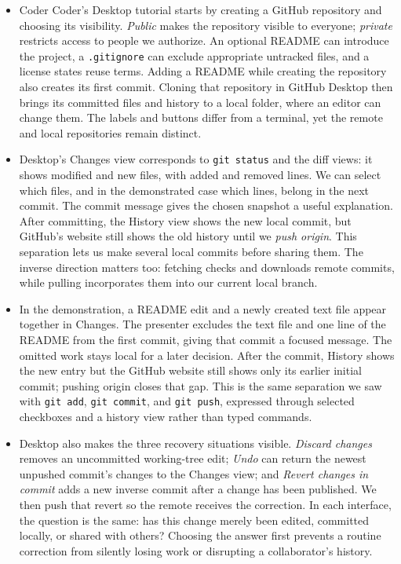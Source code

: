 \documentclass[10pt]{article}
\begin{document}
\begin{itemize}[leftmargin=1.25em, itemsep=0.3em, parsep=0pt, topsep=0pt]
    \item Coder Coder's Desktop tutorial starts by creating a GitHub repository and choosing its visibility. \emph{Public} makes the repository visible to everyone; \emph{private} restricts access to people we authorize. An optional README can introduce the project, a \texttt{.gitignore} can exclude appropriate untracked files, and a license states reuse terms. Adding a README while creating the repository also creates its first commit. Cloning that repository in GitHub Desktop then brings its committed files and history to a local folder, where an editor can change them. The labels and buttons differ from a terminal, yet the remote and local repositories remain distinct.

    \item Desktop's Changes view corresponds to \texttt{git status} and the diff views: it shows modified and new files, with added and removed lines. We can select which files, and in the demonstrated case which lines, belong in the next commit. The commit message gives the chosen snapshot a useful explanation. After committing, the History view shows the new local commit, but GitHub's website still shows the old history until we \emph{push origin}. This separation lets us make several local commits before sharing them. The inverse direction matters too: fetching checks and downloads remote commits, while pulling incorporates them into our current local branch.

    \item In the demonstration, a README edit and a newly created text file appear together in Changes. The presenter excludes the text file and one line of the README from the first commit, giving that commit a focused message. The omitted work stays local for a later decision. After the commit, History shows the new entry but the GitHub website still shows only its earlier initial commit; pushing origin closes that gap. This is the same separation we saw with \texttt{git add}, \texttt{git commit}, and \texttt{git push}, expressed through selected checkboxes and a history view rather than typed commands.

    \item Desktop also makes the three recovery situations visible. \emph{Discard changes} removes an uncommitted working-tree edit; \emph{Undo} can return the newest unpushed commit's changes to the Changes view; and \emph{Revert changes in commit} adds a new inverse commit after a change has been published. We then push that revert so the remote receives the correction. In each interface, the question is the same: has this change merely been edited, committed locally, or shared with others? Choosing the answer first prevents a routine correction from silently losing work or disrupting a collaborator's history.


\end{itemize}
\end{document}
